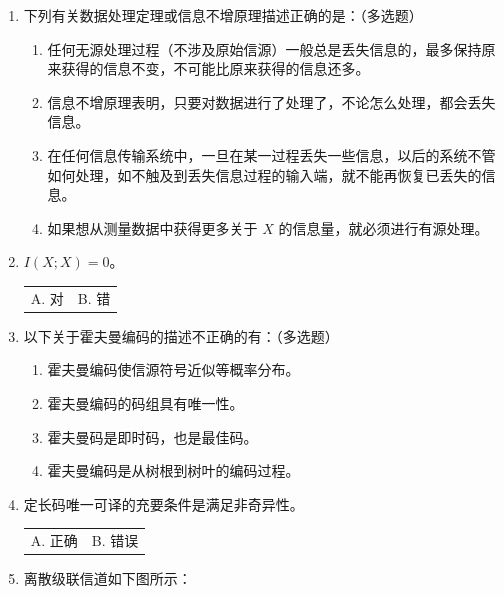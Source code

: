 \documentclass[UTF8,a4paper,12pt]{ctexart}
\begin{document}
\begin{enumerate}[label=\arabic*., leftmargin=2em, itemsep=1.4em]
\item 下列有关数据处理定理或信息不增原理描述正确的是：（多选题）

\begin{enumerate}[label=\Alph*. , leftmargin=2em, itemsep=0.6em]

\item 任何无源处理过程（不涉及原始信源）一般总是丢失信息的，最多保持原来获得的信息不变，不可能比原来获得的信息还多。

\item 信息不增原理表明，只要对数据进行了处理了，不论怎么处理，都会丢失信息。

\item 在任何信息传输系统中，一旦在某一过程丢失一些信息，以后的系统不管如何处理，如不触及到丢失信息过程的输入端，就不能再恢复已丢失的信息。

\item 如果想从测量数据中获得更多关于 $X$ 的信息量，就必须进行有源处理。

\end{enumerate}

\item $I(X;X)=0$。

\begin{tabular}{@{}p{}p{}@{}}
A. 对 & B. 错
\end{tabular}


\item 以下关于霍夫曼编码的描述不正确的有：（多选题）

\begin{enumerate}[label=\Alph*. , leftmargin=2em, itemsep=0.4em]
\item 霍夫曼编码使信源符号近似等概率分布。
\item 霍夫曼编码的码组具有唯一性。
\item 霍夫曼码是即时码，也是最佳码。
\item 霍夫曼编码是从树根到树叶的编码过程。
\end{enumerate}


\item 定长码唯一可译的充要条件是满足非奇异性。

\begin{tabular}{@{}p{}p{}@{}}
A. 正确 & B. 错误
\end{tabular}


\item 离散级联信道如下图所示：

\begin{center}
\end{center}
\end{enumerate}
\end{document}
